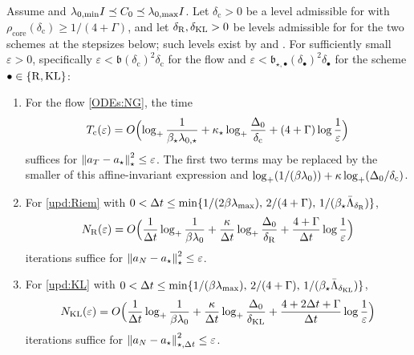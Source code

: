 \begin{theorem}
\label{thm:three-stage}
Assume  and $\lambda_{0,\min}I\preceq C_0\preceq\lambda_{0,\max}I$.
Let $\delta_{\mathrm c}>0$ be a level admissible for  with
$\rho_{\mathrm{core}}(\delta_{\mathrm c})\geq1/(4+\Gamma)$, and let
$\delta_{\mathrm{R}},\delta_{\mathrm{KL}}>0$ be levels admissible for  for the two schemes at
the stepsizes below; such levels exist by  and . For
sufficiently small $\varepsilon>0$, specifically
$\varepsilon<\mathfrak b(\delta_{\mathrm c})^2\delta_{\mathrm c}$ for the flow and
$\varepsilon<\mathfrak b_{\star,\bullet}(\delta_\bullet)^2\delta_\bullet$ for the scheme
$\bullet\in\{\mathrm{R},\mathrm{KL}\}$:
\begin{enumerate}
\item For the flow \eqref{ODEs:NG}, the time
\[
    T_{\mathrm c}(\varepsilon)
    =O\Bigl(\log_+\frac1{\beta_\star\lambda_{0,\star}}
    +\kappa_\star\log_+\frac{\Delta_0}{\delta_{\mathrm c}}
    +(4+\Gamma)\log\frac1\varepsilon\Bigr)
\]
suffices for $\left\lVert a_T-a_\star\right\rVert_\star^2\leq\varepsilon$. The first two terms may be replaced by
the smaller of this affine-invariant expression and
$\log_+(1/(\beta\lambda_0))+\kappa\log_+(\Delta_0/\delta_{\mathrm c})$.
\item For \eqref{upd:Riem} with
$0<\Delta t\leq\min\{1/(2\beta\lambda_{\max}),\,2/(4+\Gamma),\,1/(\beta_\star\bar\Lambda_{\delta_{\mathrm{R}}})\}$,
\[
    N_{\mathrm{R}}(\varepsilon)
    =O\Bigl(\frac1{\Delta t}\log_+\frac1{\beta\lambda_0}
    +\frac\kappa{\Delta t}\log_+\frac{\Delta_0}{\delta_{\mathrm{R}}}
    +\frac{4+\Gamma}{\Delta t}\log\frac1\varepsilon\Bigr)
\]
iterations suffice for $\left\lVert a_N-a_\star\right\rVert_\star^2\leq\varepsilon$.
\item For \eqref{upd:KL} with
$0<\Delta t\leq\min\{1/(\beta\lambda_{\max}),\,2/(4+\Gamma),\,1/(\beta_\star\bar\Lambda_{\delta_{\mathrm{KL}}})\}$,
\[
    N_{\mathrm{KL}}(\varepsilon)
    =O\Bigl(\frac1{\Delta t}\log_+\frac1{\beta\lambda_0}
    +\frac\kappa{\Delta t}\log_+\frac{\Delta_0}{\delta_{\mathrm{KL}}}
    +\frac{4+2\Delta t+\Gamma}{\Delta t}\log\frac1\varepsilon\Bigr)
\]
iterations suffice for $\left\lVert a_N-a_\star\right\rVert_{\star,\Delta t}^2\leq\varepsilon$.
\end{enumerate}
\end{theorem}

